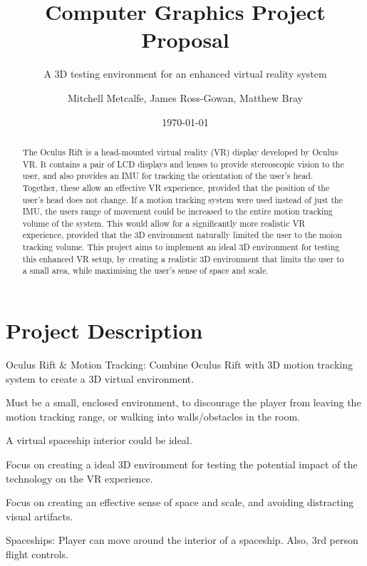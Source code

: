 \documentclass[11pt]{scrartcl} %
\title{Computer Graphics Project Proposal}
\subtitle{A 3D testing environment for an enhanced virtual reality system}
\author{Mitchell Metcalfe, James Ross-Gowan, Matthew Bray }
\date{\today} %
\begin{document}
\maketitle

\begin{abstract}

The Oculus Rift is a head-mounted virtual reality (VR) display developed by
Oculus VR. It contains a pair of LCD displays and lenses to provide stereoscopic
vision to the user, and also provides an IMU for tracking the orientation of
the user's head. Together, these allow an effective VR experience, provided
that the position of the user's head does not change. If a motion tracking
system were used instead of just the IMU, the users range of movement could be
increased to the entire motion tracking volume of the system. This would allow
for a significantly more realistic VR experience, provided that the 3D
environment naturally limited the user to the moion tracking volume. This
project aims to implement an ideal 3D environment for testing this enhanced VR
setup, by creating a realistic 3D environment that limits the user to a small area, while
maximising the user's sense of space and scale.

\end{abstract}

\section*{Project Description}
    


Oculus Rift \& Motion Tracking:
    Combine Oculus Rift with 3D motion tracking system to create a 3D virtual
    environment.

    Must be a small, enclosed environment, to discourage the player from
    leaving the motion tracking range, or walking into walls/obstacles in the
    room.

    A virtual spaceship interior could be ideal.

    Focus on creating a ideal 3D environment for testing the potential impact
    of the technology on the VR experience.

    Focus on creating an effective sense of space and scale, and avoiding
    distracting visual artifacts.

Spaceships:
    Player can move around the interior of a spaceship.
    Also, 3rd person flight controls.
\end{document}
